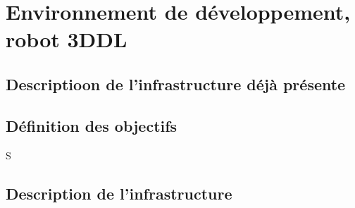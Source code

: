 \chapter{Environnement de développement, robot 3DDL}     %

\section{Descriptioon de l'infrastructure déjà présente}
\section{Définition des objectifs}S
\section{Description de l'infrastructure}